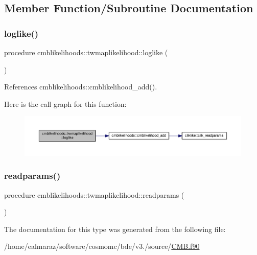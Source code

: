 \subsection{Member Function/\+Subroutine Documentation}
\mbox{\label{structcmblikelihoods_1_1twmaplikelihood_a4b40206256593e631259053a1ce173e0}} 
\subsubsection{\texorpdfstring{loglike()}{loglike()}}
{\footnotesize\ttfamily procedure cmblikelihoods\+::twmaplikelihood\+::loglike (\begin{DoxyParamCaption}{ }\end{DoxyParamCaption})\hspace{0.3cm}{\ttfamily [private]}}



References cmblikelihoods\+::cmblikelihood\+\_\+add().

Here is the call graph for this function\+:
\nopagebreak
\begin{figure}[H]
\begin{center}
\leavevmode
\includegraphics[width=350pt]{structcmblikelihoods_1_1twmaplikelihood_a4b40206256593e631259053a1ce173e0_cgraph}
\end{center}
\end{figure}
\mbox{\label{structcmblikelihoods_1_1twmaplikelihood_a64795c1c3dcfaf968d1caa1742283c58}} 
\subsubsection{\texorpdfstring{readparams()}{readparams()}}
{\footnotesize\ttfamily procedure cmblikelihoods\+::twmaplikelihood\+::readparams (\begin{DoxyParamCaption}{ }\end{DoxyParamCaption})\hspace{0.3cm}{\ttfamily [private]}}



The documentation for this type was generated from the following file\+:\begin{DoxyCompactItemize}
\item 
/home/ealmaraz/software/cosmomc/bde/v3./source/\mbox{\hyperlink{CMB_8f90}{C\+M\+B.\+f90}}\end{DoxyCompactItemize}
